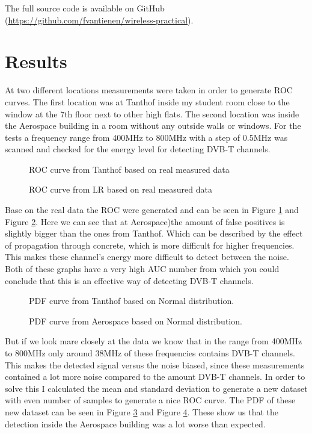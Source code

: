 \documentclass[]{article}
\begin{document}
The full source code is available on GitHub (\url{https://github.com/fvantienen/wireless-practical}).

\section{Results}
At two different locations measurements were taken in order to generate ROC curves.
The first location was at Tanthof inside my student room close to the window at the 7th floor next to other high flats.
The second location was inside the Aerospace building in a room without any outside walls or windows.
For the tests a frequency range from 400MHz to 800MHz with a step of 0.5MHz was scanned and checked for the energy level for detecting DVB-T channels.

\begin{figure}[H]
    
    \caption{ROC curve from Tanthof based on real measured data\label{fig:roc_tant_real}}
\end{figure}
\begin{figure}[H]
    
    \caption{ROC curve from LR based on real measured data\label{fig:roc_lr_real}}
\end{figure}

\newpage
Base on the real data the ROC were generated and can be seen in Figure \ref{fig:roc_tant_real} and Figure \ref{fig:roc_lr_real}.
Here we can see that at Aerospace)the amount of false positives is slightly bigger than the ones from Tanthof.
Which can be described by the effect of propagation through concrete, which is more difficult for higher frequencies.
This makes these channel's energy more difficult to detect between the noise.
Both of these graphs have a very high AUC number from which you could conclude that this is an effective way of detecting DVB-T channels.

\begin{figure}[H]
    
    \caption{PDF curve from Tanthof based on Normal distribution.\label{fig:pdf_tant_norm}}
\end{figure}
\begin{figure}[H]
    
    \caption{PDF curve from Aerospace based on Normal distribution.\label{fig:pdf_lr_norm}}
\end{figure}

But if we look mare closely at the data we know that in the range from 400MHz to 800MHz only  around 38MHz of these frequencies contains DVB-T channels.
This makes the detected signal versus the noise biased, since these measurements contained a lot more noise compared to the amount DVB-T channels.
In order to solve this I calculated the mean and standard deviation to generate a new dataset with even number of samples to generate a nice ROC curve.
The PDF of these new dataset can be seen in Figure \ref{fig:pdf_tant_norm} and Figure \ref{fig:pdf_lr_norm}.
These show us that the detection inside the Aerospace building was a lot worse than expected.
\end{document}

